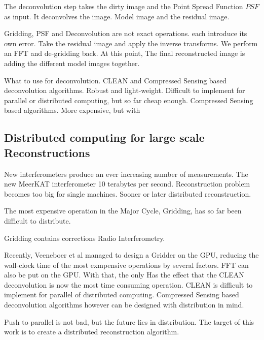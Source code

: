 The deconvolution step takes the dirty image and the Point Spread Function $PSF$ as input. It deconvolves the image. Model image and the residual image.

Gridding, PSF and Deconvolution are not exact operations. each introduce its own error. Take the residual image and apply the inverse transforms. We perform an FFT and de-gridding back.
At this point, 
The final reconstructed image is adding the different model images together.

What to use for deconvolution. CLEAN and Compressed Sensing based deconvolution algorithms. Robust and light-weight. Difficult to implement for parallel or distributed computing, but so far cheap enough. Compressed Sensing based algorithms. More expensive, but with 

\subsection{Distributed computing for large scale Reconstructions}
New interferometers produce an ever increasing number of measurements. The new MeerKAT interferometer 10 terabytes per second. Reconstruction problem becomes too big for single machines. Sooner or later distributed reconstruction.

The most expensive operation in the Major Cycle, Gridding, has so far been difficult to distribute.

Gridding contains corrections Radio Interferometry.

Recently, Veeneboer et al\cite{veenboer2017image} managed to design a Gridder on the GPU, reducing the wall-clock time of the most exmpensive operations by several factors.
FFT can also be put on the GPU. 
With that, the only Has the effect that the CLEAN deconvolution is now the most time consuming operation. CLEAN is difficult to implement for parallel of distributed computing. Compressed Sensing based deconvolution algorithms however can be designed with distribution in mind. 

Push to parallel is not bad, but the future lies in distribution. The target of this work is to create a distributed reconstruction algorithm.






